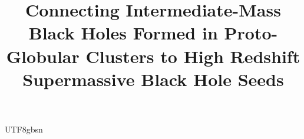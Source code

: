 \documentclass[trackchanges, twocolappendix, twocolumn]{aastex701}
\begin{document}
\begin{CJK*}{UTF8}{gbsn}

\title{Connecting Intermediate-Mass Black Holes Formed in Proto-Globular Clusters to High Redshift Supermassive Black Hole Seeds}



\end{CJK*}
\end{document}
